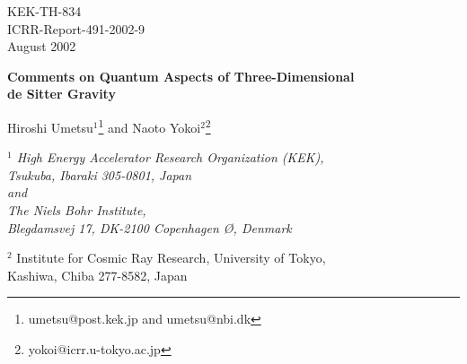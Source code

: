 \documentclass[a4paper,11pt]{article}
\begin{document}
\setlength{\baselineskip}{6mm}


\begin{titlepage}

\begin{flushright}
KEK-TH-834 \\
ICRR-Report-491-2002-9\\
August 2002
\end{flushright}



\vspace{10mm}
\begin{center}
{\Large \bf Comments on Quantum Aspects of Three-Dimensional} \\
{\Large \bf  de Sitter Gravity}

\vspace{10mm}

\renewcommand{\thefootnote}{\fnsymbol{footnote}}

{\large Hiroshi Umetsu}$^1$\footnote{
umetsu@post.kek.jp and umetsu@nbi.dk}  
{\large and Naoto Yokoi}$^2$\footnote{
yokoi@icrr.u-tokyo.ac.jp} 

\renewcommand{\thefootnote}{\arabic{footnote}}
\setcounter{footnote}{0}

\vspace{5mm}

{\it
$^1$ High Energy Accelerator Research Organization (KEK), \\
     Tsukuba, Ibaraki 305-0801, Japan \\
     and \\
     The Niels Bohr Institute, \\
     Blegdamsvej 17, DK-2100 Copenhagen \O, Denmark

\vspace{5mm}

$^2$ Institute for Cosmic Ray Research, University of Tokyo,\\
     Kashiwa, Chiba 277-8582, Japan
}
\end{center}

\vspace{5mm}

\begin{abstract}


\end{abstract}
\end{titlepage}
\end{document}
